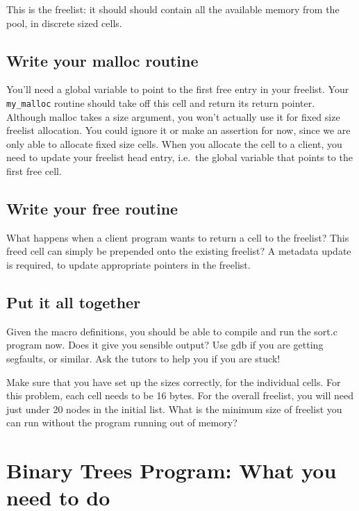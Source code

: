 \documentclass{article}
\begin{document}
This is the freelist: it should should contain all the
available memory from the pool, in discrete sized cells.

\subsection{Write your malloc routine}

You'll need a global variable to point to the first free
entry in your freelist. Your \lstinline|my_malloc| routine
should take off this cell and return its return pointer.
Although malloc takes a size argument, you won't actually use it
for fixed size freelist allocation.
You could ignore it or make an assertion for now,
since we are only able to allocate fixed size cells.
When you allocate the cell to a client, you
need to update your freelist head entry, i.e.\ the
global variable that points to the first free cell.

\subsection{Write your free routine}

What happens when a client program
wants to return a cell to the freelist?
This freed cell can simply be prepended onto the existing freelist?
A metadata update is required, to update appropriate pointers in the freelist.

\subsection{Put it all together}

Given the macro definitions, you should be able to
compile and run the sort.c program now.
Does it give you sensible output?
Use gdb if you are getting segfaults, or similar.
Ask the tutors to help you if you are stuck!

Make sure that you have set up the sizes correctly, for
the individual cells. For this problem, each cell needs
to be 16 bytes.
For the overall freelist, you will need just under 20 nodes
in the initial list. What is the minimum size of freelist you can
run without the program running out of memory?


\section{Binary Trees Program: What you need to do}
\end{document}
